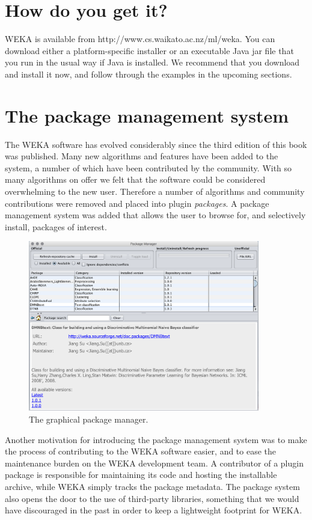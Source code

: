 \section{How do you get it?}

WEKA is available from http://www.cs.waikato.ac.nz/ml/weka. You can
download either a platform-specific installer or an executable Java jar
file that you run in the usual way if Java is installed. We recommend
that you download and install it now, and follow through the examples
in the upcoming sections.

\section{The package management system}

The WEKA software has evolved considerably since the third edition of
this book was published. Many new algorithms and features have been
added to the system, a number of which have been contributed by the
community. With so many algorithms on offer we felt that the software
could be considered overwhelming to the new user. Therefore a number
of algorithms and community contributions were removed and placed into
plugin {\em packages}. A package management system was added that allows the
user to browse for, and selectively install, packages of interest.

\begin{figure}[!th]
\centering
\includegraphics[width=0.9\textwidth]{images/P1.png}
\caption{The graphical package manager.}
\label{fig:package_manager}
\end{figure}

Another motivation for introducing the package management system was
to make the process of contributing to the WEKA software easier, and
to ease the maintenance burden on the WEKA development team. A
contributor of a plugin package is responsible for maintaining its
code and hosting the installable archive, while WEKA simply tracks
the package metadata. The package system also opens the door to the
use of third-party libraries, something that we would have discouraged
in the past in order to keep a lightweight footprint for WEKA.  

